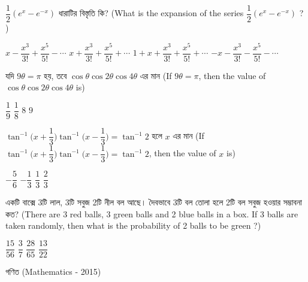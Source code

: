 \documentclass[addpoints]{exam}
\begin{document}
\begin{questions}
\begin{oneparchoices}
\end{oneparchoices}

\question  $ \dfrac{1}{2}(e^{x}-e^{-x}) $   ধারাটির বিস্তৃতি কি? (What is the expansion of the series  $ \dfrac{1}{2}(e^{x}-e^{-x}) $ ? )

\begin{oneparchoices}
\choice $ x-\dfrac{x^{3}}{3!} +\dfrac{x^{5}}{5!}-\cdots$
\choice $ x+\dfrac{x^{3}}{3!} +\dfrac{x^{5}}{5!}+\cdots$
\choice $ 1+x+\dfrac{x^{3}}{3!} +\dfrac{x^{5}}{5!}+\cdots$
\choice  $ -x-\dfrac{x^{3}}{3!} -\dfrac{x^{5}}{5!}-\cdots$

\end{oneparchoices}

\question   যদি $ 9\theta = \pi $ হয়, তবে $ \cos\theta\cos 2\theta \cos 4\theta $ এর মান (If $ 9\theta = \pi $, then the value of $ \cos\theta\cos 2\theta \cos 4\theta $ is)

\begin{oneparchoices}
\choice $ \dfrac{1}{9} $
\choice $ \dfrac{1}{8} $
\choice $ 8 $
\choice  $ 9 $

\end{oneparchoices}

\question  $ \tan^{-1}\Bigg(x+\dfrac{1}{3}\Bigg) \tan^{-1}\Bigg(x-\dfrac{1}{3}\Bigg) =\tan^{-1}2 $  হলে $ x $ এর মান (If $ \tan^{-1}\Bigg(x+\dfrac{1}{3}\Bigg) \tan^{-1}\Bigg(x-\dfrac{1}{3}\Bigg) =\tan^{-1}2 $, then the value of $ x $ is)

\begin{oneparchoices}
\choice $ -\dfrac{5}{6} $
\choice $ -\dfrac{1}{3} $
\choice $ \dfrac{1}{3} $
\choice  $ \dfrac{2}{3} $

\end{oneparchoices}

\question   একটি বাক্সে 3টি লাল, 3টি সবুজ 2টি নীল বল আছে। দৈবভাবে 3টি বল তোলা হলে 2টি বল সবুজ হওয়ার সম্ভাবনা কত? (There are 3 red balls, 3 green balls and 2 blue balls in a box. If 3 balls are taken randomly, then what is the probability of 2 balls to be green ?)

\begin{oneparchoices}
\choice $ \dfrac{15}{56} $
\choice $ \dfrac{3}{7} $
\choice $ \dfrac{28}{65} $
\choice  $  \dfrac{13}{22} $

\end{oneparchoices}

\end{questions}
\begin{LARGE}
\begin{center}
গণিত (Mathematics - 2015)
\end{center}
\end{LARGE}
\end{document}
